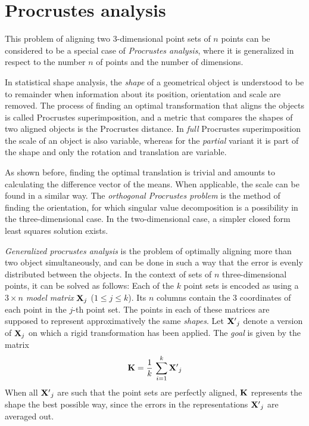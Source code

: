 \section{Procrustes analysis} \label{sec:procrustes}
This problem of aligning two $3$-dimensional point sets of $n$ points can be considered to be a special case of \emph{Procrustes analysis}, where it is generalized in respect to the number $n$ of points and the number of dimensions.

In statistical shape analysis, the \emph{shape} of a geometrical object is understood to be to remainder when information about its position, orientation and scale are removed. The process of finding an optimal transformation that aligns the objects is called Procrustes superimposition, and a metric that compares the shapes of two aligned objects is the Procrustes distance. In \emph{full} Procrustes superimposition the scale of an object is also variable, whereas for the \emph{partial} variant it is part of the shape and only the rotation and translation are variable. 

As shown before, finding the optimal translation is trivial and amounts to calculating the difference vector of the means. When applicable, the scale can be found in a similar way. The \emph{orthogonal Procrustes problem} is the method of finding the orientation, for which singular value decomposition is a possibility in the three-dimensional case. In the two-dimensional case, a simpler closed form least squares solution exists.

\emph{Generalized procrustes analysis} is the problem of optimally aligning more than two object simultaneously, and can be done in such a way that the error is evenly distributed between the objects.
 In the context of sets of $n$ three-dimensional points, it can be solved as follows: Each of the $k$ point sets is encoded as using a $3 \times n$ \emph{model matrix} $\mathbf{X}_j$ ($1 \leq j \leq k$). Its $n$ columns contain the $3$ coordinates of each point in the $j$-th point set. The points in each of these matrices are supposed to represent approximatively the same \emph{shapes}. Let $\mathbf{X'}_j$ denote a version of $\mathbf{X}_j$ on which a rigid transformation has been applied. The \emph{goal} is given by the matrix
\begin{equation} \label{eq:procrustes}
\mathbf{K} = \frac{1}{k} \, \sum_{i=1}^{k} \mathbf{X'}_j
\end{equation}
When all $\mathbf{X'}_j$ are such that the point sets are perfectly aligned, $\mathbf{K}$ represents the shape the best possible way, since the errors in the representations $\mathbf{X'}_j$ are averaged out.

